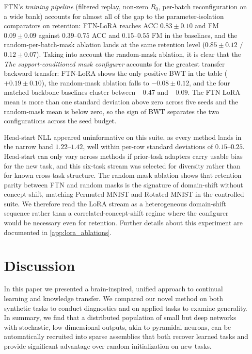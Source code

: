 \documentclass[11pt]{article}
\begin{document}
FTN's \emph{training pipeline} (filtered replay, non-zero $B_0$, per-batch reconfiguration on a wide bank) accounts for almost all of the gap to the parameter-isolation comparators on retention: FTN-LoRA reaches ACC $0.83\pm0.10$ and FM $0.09\pm0.09$ against $0.39$--$0.75$ ACC and $0.15$--$0.55$ FM in the baselines, and the random-per-batch-mask ablation lands at the same retention level ($0.85\pm0.12$ / $0.12\pm0.07$). Taking into account the random-mask ablation, it is clear that the \emph{The support-conditioned mask configurer} accounts for the greatest transfer backward transfer: FTN-LoRA shows the only positive BWT in the table ($+0.19\pm0.10$), the random-mask ablation falls to $-0.08\pm0.12$, and the four matched-backbone baselines cluster between $-0.47$ and $-0.09$. The FTN-LoRA mean is more than one standard deviation above zero across five seeds and the random-mask mean is below zero, so the sign of BWT separates the two configurations across the seed budget.

Head-start NLL appeared uninformative on this suite, as every method lands in the narrow band $1.22$--$1.42$, well within per-row standard deviations of $0.15$--$0.25$. Head-start can only vary across methods if prior-task adapters carry usable bias for the new task, and this six-task stream was selected for diversity rather than for known cross-task structure. The random-mask ablation shows that retention parity between FTN and random masks is the signature of domain-shift without concept-shift, matching Permuted MNIST and Rotated MNIST in the controlled suite. We therefore read the LoRA stream as a heterogeneous domain-shift sequence rather than a correlated-concept-shift regime where the configurer would be necessary even for retention. Further details about this experiment are documented in \cref{app:lora_ablations}.

\section{Discussion}\label{sec:discussion}
In this paper we presented a brain-inspired, unified approach to continual learning and knowledge transfer. We compared our novel method on both synthetic tasks to conduct diagnostics and on applied tasks to examine generality. In summary, we find that a distributed population of small but deep networks with stochastic, low-dimensional outputs, akin to pyramidal neurons, can be automatically recruited into sparse assemblies that both recover learned tasks and provide significant advantage over random initialization on new tasks.
\end{document}
